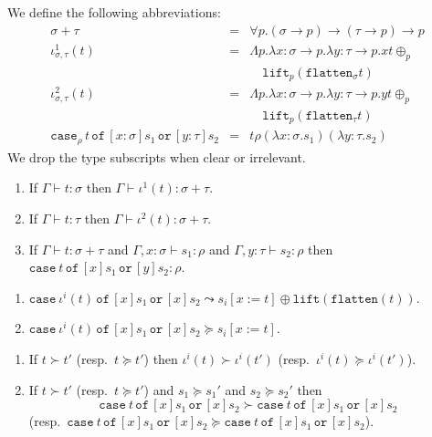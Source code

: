 \documentclass[runningheads,a4paper]{llncs}
\newcommand{\arrtype}{\rightarrow}
\newcommand{\abs}[2]{\lambda #1.#2}
\newcommand{\tabs}[2]{\Lambda #1.#2}
\newcommand{\subst}[2]{#1:=#2}
\newcommand{\flatten}{\mathtt{flatten}}
\newcommand{\lift}{\mathtt{lift}}
\newcommand{\proves}{\vdash}
\newcommand{\xcase}[4]{\mathtt{case}_{#1}\,#2\,\mathtt{of}\,#3\,\mathtt{or}\,#4}
\begin{document}
\begin{definition}\normalfont
  We define the following abbreviations:
  \[
  \begin{array}{rcl}
    \sigma + \tau &=& \forall p . (\sigma \arrtype p) \arrtype (\tau \arrtype p) \arrtype p \\
    \iota^1_{\sigma,\tau}(t) &=&  \tabs{p}{\abs{x:\sigma\arrtype p}{\abs{y:\tau\arrtype p}{x t \oplus_p \\&&\quad\lift_p(\flatten_\sigma t)}}} \\
    \iota^2_{\sigma,\tau}(t) &=&  \tabs{p}{\abs{x:\sigma\arrtype p}{\abs{y:\tau\arrtype p}{y t \oplus_p \\&&\quad\lift_p(\flatten_\tau t)}}} \\
    \xcase{\rho}{t}{[x:\sigma]s_1}{[y:\tau]s_2} &=& t \rho (\abs{x:\sigma}{s_1}) (\abs{y:\tau}{s_2})
  \end{array}
  \]
  We drop the type subscripts when clear or irrelevant.
\end{definition}

\begin{lemma}
  \begin{enumerate}
  \item If $\Gamma \proves t : \sigma$ then $\Gamma \proves \iota^1(t) : \sigma + \tau$.
  \item If $\Gamma \proves t : \tau$ then $\Gamma \proves \iota^2(t) : \sigma + \tau$.
  \item If $\Gamma \proves t : \sigma + \tau$ and $\Gamma,x:\sigma
    \proves s_1 : \rho$ and $\Gamma,y:\tau\proves s_2 : \rho$ then
    $\xcase{}{t}{[x]s_1}{[y]s_2} : \rho$.
  \end{enumerate}
\end{lemma}

\begin{lemma}
  \begin{enumerate}
  \item $\xcase{}{\iota^i(t)}{[x]s_1}{[x]s_2} \leadsto
    s_i[\subst{x}{t}] \oplus \lift(\flatten(t))$.
  \item $\xcase{}{\iota^i(t)}{[x]s_1}{[x]s_2} \succeq
    s_i[\subst{x}{t}]$.
  \end{enumerate}
\end{lemma}

\begin{lemma}
  \begin{enumerate}
  \item If $t \succ t'$ (resp.~$t \succeq t'$) then $\iota^i(t) \succ
    \iota^i(t')$ (resp.~$\iota^i(t) \succeq \iota^i(t')$).
  \item If $t \succ t'$ (resp.~$t \succeq t'$) and $s_1 \succeq s_1'$
    and $s_2 \succeq s_2'$ then
    \[
    \xcase{}{t}{[x]s_1}{[x]s_2} \succ \xcase{}{t}{[x]s_1}{[x]s_2}
    \]
    (resp.~$\xcase{}{t}{[x]s_1}{[x]s_2} \succeq
    \xcase{}{t}{[x]s_1}{[x]s_2}$).
  \end{enumerate}
\end{lemma}
\end{document}
